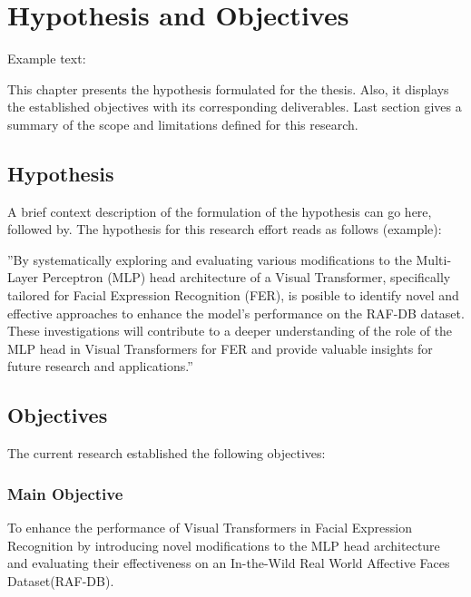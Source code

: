 \chapter{Hypothesis and Objectives}
\label{chapter:hypothesis-objectives}
Example text:

This chapter presents the hypothesis formulated for the thesis. Also, it displays the established objectives with its corresponding deliverables. Last section gives a summary of the scope and limitations defined for this research.

\section{Hypothesis}
\label{section:hypothesis}
A brief context description of the formulation of the hypothesis can go here, followed by.
The hypothesis for this research effort reads as follows (example):



''By systematically exploring and evaluating various modifications to the Multi-Layer Perceptron (MLP) head architecture of a Visual Transformer, specifically tailored for Facial Expression Recognition (FER), is posible to identify novel and effective approaches to enhance the model's performance on the RAF-DB dataset. These investigations will contribute to a deeper understanding of the role of the MLP head in Visual Transformers for FER and provide valuable insights for future research and applications.''


\section{Objectives}
\label{section:objectives}
The current research established the following objectives:

\subsection{Main Objective}
\label{section:main-objective}
\label{objective:main}

To enhance the performance of Visual Transformers in Facial Expression Recognition by introducing novel modifications to the MLP head architecture and evaluating their effectiveness on an In-the-Wild Real World Affective Faces Dataset(RAF-DB).

